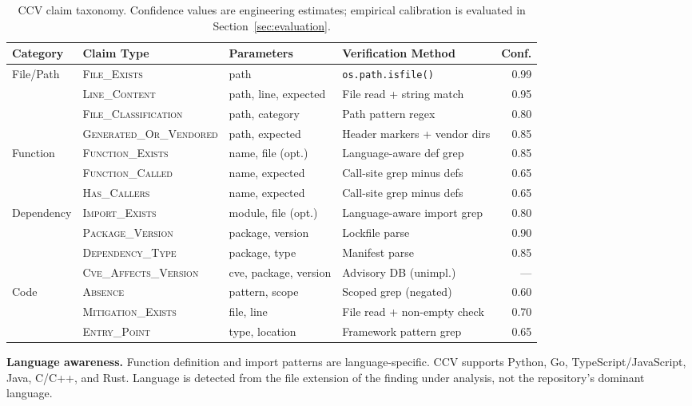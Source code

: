 \begin{table}[t]
\centering
\caption{CCV claim taxonomy. Confidence values are engineering estimates; empirical calibration is evaluated in Section~\ref{sec:evaluation}.}
\label{tab:taxonomy}
\small
\begin{tabular}{llllr}
\toprule
\textbf{Category} & \textbf{Claim Type} & \textbf{Parameters} & \textbf{Verification Method} & \textbf{Conf.} \\
\midrule
\multirow{4}{*}{File/Path}
& \textsc{File\_Exists} & path & \texttt{os.path.isfile()} & 0.99 \\
& \textsc{Line\_Content} & path, line, expected & File read + string match & 0.95 \\
& \textsc{File\_Classification} & path, category & Path pattern regex & 0.80 \\
& \textsc{Generated\_Or\_Vendored} & path, expected & Header markers + vendor dirs & 0.85 \\
\midrule
\multirow{3}{*}{Function}
& \textsc{Function\_Exists} & name, file (opt.) & Language-aware def grep & 0.85 \\
& \textsc{Function\_Called} & name, expected & Call-site grep minus defs & 0.65 \\
& \textsc{Has\_Callers} & name, expected & Call-site grep minus defs & 0.65 \\
\midrule
\multirow{4}{*}{Dependency}
& \textsc{Import\_Exists} & module, file (opt.) & Language-aware import grep & 0.80 \\
& \textsc{Package\_Version} & package, version & Lockfile parse & 0.90 \\
& \textsc{Dependency\_Type} & package, type & Manifest parse & 0.85 \\
& \textsc{Cve\_Affects\_Version} & cve, package, version & Advisory DB (unimpl.) & --- \\
\midrule
\multirow{3}{*}{Code}
& \textsc{Absence} & pattern, scope & Scoped grep (negated) & 0.60 \\
& \textsc{Mitigation\_Exists} & file, line & File read + non-empty check & 0.70 \\
& \textsc{Entry\_Point} & type, location & Framework pattern grep & 0.65 \\
\bottomrule
\end{tabular}
\end{table}

\textbf{Language awareness.} Function definition and import patterns are language-specific. CCV supports Python, Go, TypeScript/JavaScript, Java, C/C++, and Rust. Language is detected from the file extension of the finding under analysis, not the repository's dominant language.

